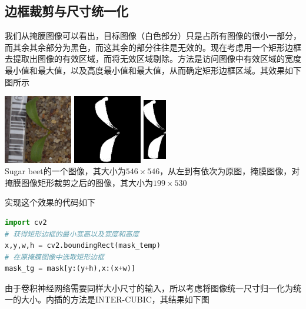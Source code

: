\subsection{边框裁剪与尺寸统一化}
我们从掩膜图像可以看出，目标图像（白色部分）只是占所有图像的很小一部分，而其余其余部分为黑色，而这其余的部分往往是无效的。现在考虑用一个矩形边框去提取出图像的有效区域，而将无效区域剔除。方法是访问图像中有效区域的宽度最小值和最大值，以及高度最小值和最大值，从而确定矩形边框区域。其效果如下图所示
\begin{center}
\includegraphics[width=30mm,height=30mm]{../figures/Sugar_beet_1bdfd2206.png} 
\includegraphics[width=30mm,height=30mm]{../figures/Sugar_beet_1bdfd2206_mask.png} 	
\includegraphics[width=10mm,height=30mm]{../figures/Sugar_beet_1bdfd2206_mask_tg.png} 	\\
Sugar beet的一个图像，其大小为$546\times 546$，从左到有依次为原图，掩膜图像，对掩膜图像矩形裁剪之后的图像，其大小为$199\times 530$
\end{center}
实现这个效果的代码如下
\begin{lstlisting}[language=python]
import cv2
# 获得矩形边框的最小宽高以及宽度和高度
x,y,w,h = cv2.boundingRect(mask_temp)
# 在原掩膜图像中选取矩形边框
mask_tg = mask[y:(y+h),x:(x+w)]
\end{lstlisting}
由于卷积神经网络需要同样大小尺寸的输入，所以考虑将图像统一尺寸归一化为统一的大小。内插的方法是INTER-CUBIC，其结果如下图
